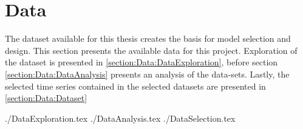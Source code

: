\chapter{Data}
\label{section:Data}




The dataset available for this thesis creates the basis for model selection and design.
This section presents the available data for this project.
Exploration of the dataset is presented in \cref{section:Data:DataExploration},
before section \cref{section:Data:DataAnalysis} presents an analysis of the data-sets.
Lastly, the selected time series contained in the selected datasets are presented in \cref{section:Data:Dataset}

{./DataExploration.tex}
{./DataAnalysis.tex}
{./DataSelection.tex}
